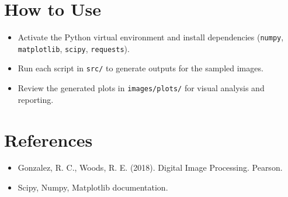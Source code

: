 \documentclass[11pt,a4paper]{article}
\begin{document}
\section*{How to Use}
\begin{itemize}
  \item Activate the Python virtual environment and install dependencies (\texttt{numpy}, \texttt{matplotlib}, \texttt{scipy}, \texttt{requests}).
  \item Run each script in \texttt{src/} to generate outputs for the sampled images.
  \item Review the generated plots in \texttt{images/plots/} for visual analysis and reporting.
\end{itemize}

\section*{References}
\begin{itemize}
  \item Gonzalez, R. C., Woods, R. E. (2018). Digital Image Processing. Pearson.
  \item Scipy, Numpy, Matplotlib documentation.
\end{itemize}
\end{document}
